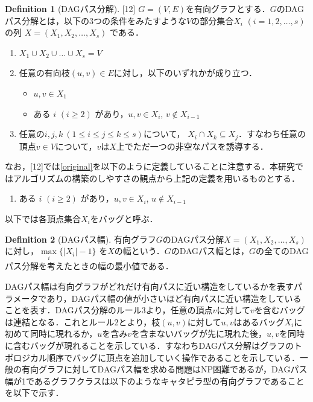 \documentclass[master]{kuisthesis}		%
\theoremstyle{plain}
\theoremstyle{definition}
\newtheorem{definition*}{Definition}
\begin{document}
\begin{definition*}[DAGパス分解][12]
    $G=(V, E)$を有向グラフとする．$G$のDAGパス分解とは，以下の3つの条件をみたすような$V$の部分集合$X_i$ $(i = 1, 2,  \dots, s)$の列 $X=(X_1, X_2,  \dots, X_s)$ である．
    
    \begin{enumerate}
        \item $ X_1 \cup X_2 \cup \dots \cup X_s = V $ 
        \item 任意の有向枝$(u, v) \in E$に対し，以下のいずれかが成り立つ．
        \begin{itemize}
            \item $u, v \in X_1$
            \item ある $i$ $(i \geq 2)$ があり，$u, v \in X_i$, $v \notin X_{i-1}$ \label{original}
        \end{itemize}
        \item 任意の$ i, j, k\ (1 \leq i \leq j \leq k \leq s)$について， $X_i \cap X_k \subseteq X_j$．すなわち任意の頂点$v \in V$について，$v$は$X$上でただ一つの非空なパスを誘導する．
    \end{enumerate}
    
\end{definition*}

なお，[12]では\ref{original}を以下のように定義していることに注意する．本研究ではアルゴリズムの構築のしやすさの観点から上記の定義を用いるものとする．
\begin{enumerate}
    \item ある $i$ $(i \geq 2)$ があり，$u, v \in X_i$, $u \notin X_{i-1}$ \label{original}
\end{enumerate}

以下では各頂点集合$X_i$をバッグと呼ぶ．

\begin{definition*}[DAGパス幅]
    有向グラフ$G$のDAGパス分解$X=(X_1, X_2,   \dots, X_s)$に対し，$ \underset{i}{\max} \{ |X_i|-1 \}$ を$X$の幅という．$G$のDAGパス幅とは，$G$の全てのDAGパス分解を考えたときの幅の最小値である．
\end{definition*}



DAGパス幅は有向グラフがどれだけ有向パスに近い構造をしているかを表すパラメータであり，DAGパス幅の値が小さいほど有向パスに近い構造をしていることを表す．DAGパス分解のルール3より，任意の頂点$v$に対して$v$を含むバッグは連結となる．これとルール2とより，枝$(u, v)$に対して$u, v$はあるバッグ$X_i$に初めて同時に現れるか，$u$を含み$v$を含まないバッグが先に現れた後，$u, v$を同時に含むバッグが現れることを示している．すなわちDAGパス分解はグラフのトポロジカル順序でバッグに頂点を追加していく操作であることを示している．一般の有向グラフに対してDAGパス幅を求める問題はNP困難であるが，DAGパス幅が1であるグラフクラスは以下のようなキャタピラ型の有向グラフであることを以下で示す．
\end{document}
